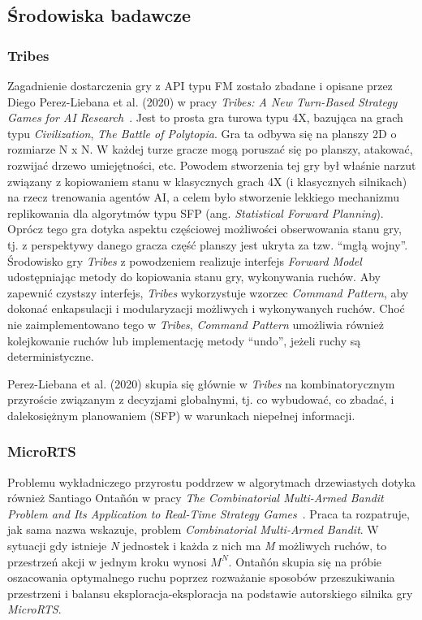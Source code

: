 \documentclass[
    bindingoffset=5mm,
    footnoteindent=3mm,
    hyphenation=true
]{src/wut-thesis}
\begin{document}
\subsection{Środowiska badawcze}

\subsubsection{Tribes}

Zagadnienie dostarczenia gry z API typu FM zostało zbadane i opisane przez Diego
Perez-Liebana et al. (2020) w pracy \emph{Tribes: A New Turn-Based Strategy Games for AI
    Research}~\cite{TRIBES}. Jest to prosta gra turowa typu 4X, bazująca na grach typu
\emph{Civilization}, \emph{The Battle of Polytopia}. Gra ta odbywa się na planszy 2D o rozmiarze N x
N. W każdej turze gracze mogą poruszać się po planszy, atakować, rozwijać drzewo
umiejętności, etc. Powodem stworzenia tej gry był właśnie narzut związany z
kopiowaniem stanu w klasycznych grach 4X (i klasycznych silnikach) na rzecz
trenowania agentów AI, a celem było stworzenie lekkiego mechanizmu replikowania
dla algorytmów typu SFP (ang. \emph{Statistical Forward Planning}). Oprócz tego gra dotyka
aspektu częściowej możliwości obserwowania stanu gry, tj. z perspektywy danego
gracza część planszy jest ukryta za tzw. “mgłą wojny”. Środowisko gry \emph{Tribes} z
powodzeniem realizuje interfejs \emph{Forward Model} udostępniając metody do kopiowania
stanu gry, wykonywania ruchów. Aby zapewnić czystszy interfejs, \emph{Tribes} wykorzystuje
wzorzec \emph{Command Pattern}, aby dokonać enkapsulacji i modularyzacji możliwych i
wykonywanych ruchów. Choć nie zaimplementowano tego w \emph{Tribes}, \emph{Command Pattern}
umożliwia również kolejkowanie ruchów lub implementację metody “undo”, jeżeli ruchy
są deterministyczne.

Perez-Liebana et al. (2020) skupia się głównie w \emph{Tribes} na kombinatorycznym
przyroście związanym z decyzjami globalnymi, tj. co wybudować, co zbadać, i
dalekosiężnym planowaniem (SFP) w warunkach niepełnej informacji.

\subsubsection{MicroRTS}

Problemu wykładniczego przyrostu poddrzew w algorytmach drzewiastych dotyka
również Santiago Ontañón w pracy \emph{The Combinatorial Multi-Armed Bandit Problem
    and Its Application to Real-Time Strategy Games}~\cite{MULTI_ARMED_BANDIT}. Praca ta
rozpatruje, jak sama nazwa wskazuje, problem \emph{Combinatorial Multi-Armed Bandit}. W
sytuacji gdy istnieje \emph{N} jednostek i każda z nich ma \emph{M} możliwych ruchów, to przestrzeń
akcji w jednym kroku wynosi $M^N$. Ontañón skupia się na próbie oszacowania
optymalnego ruchu poprzez rozważanie sposobów przeszukiwania przestrzeni i
balansu eksploracja-eksploracja na podstawie autorskiego silnika gry \emph{MicroRTS}.
\end{document}
